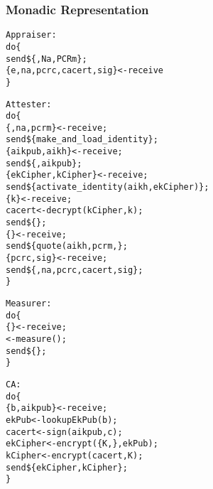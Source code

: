 \documentclass[10pt]{article}
\begin{document}

\newpage

\subsubsection*{Monadic Representation}

\begin{alltt}
  Appraiser:
  do \{     
       send \att \$ \{ \evd, Na, PCRm \} ;    % 
       \{ e, na, pcrc, cacert, sig \}  <- receive \att
  \}
\end{alltt}

\begin{alltt}
  Attester:
  do \{     
       \{ \evd, na, pcrm \}  <- receive \app;
       send \tp \$ \{ make\_and\_load\_identity \};
       \{ aikpub, aikh \} <- receive \tp;
       send \ca \$ \{ \att, aikpub \};
       \{ ekCipher, kCipher \} <- receive \ca;
       send \tp \$ \{ activate_identity(aikh, ekCipher) \};
       \{ k \} <- receive \tp;
       cacert <- decrypt(kCipher, k);
       send \mea \$ \{ \evd \};
       \{ \eve \} <- receive \tp;
       send \tp \$ \{ quote(aikh, pcrm,  \};
       \{ pcrc, sig \} <- receive \tp;
       send \app \$ \{ \eve, na, pcrc, cacert, sig \};
  \}
\end{alltt}

\begin{alltt}
  Measurer:
  do \{     
       \{ \evd \}  <- receive \att;
       \eve <- measure(\evd);
       send \att \$ \{ \eve \};
  \}
\end{alltt}

\begin{alltt}
  CA:
  do \{     
       \{ b, aikpub \}  <- receive \att;
       ekPub <- lookupEkPub(b);
       cacert <- sign(aikpub, c);
       ekCipher <- encrypt( \{ K,  \}, ekPub );
       kCipher <- encrypt( cacert, K);
       send \att \$ \{ ekCipher, kCipher \};
  \}
\end{alltt}
\end{document}
